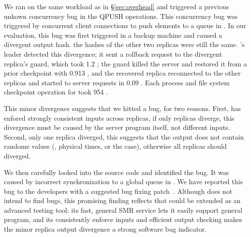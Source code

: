 We ran \ssdb on the same workload as in \S\ref{sec:overhead} and triggered a 
previous unkown concurrency bug in the QPUSH operations. This concurrency bug 
was triggered by concurrent client connections to push elements to a queue in 
\ssdb. In our evaluation, this bug was first triggered in a backup machine and 
caused a divergent output hash. the hashes of the other two replicas were 
still the same. \xxx's leader detected this divergence; it sent a 
rollback request to the divergent replica's guard, which took 1.2 \ms; 
the guard killed the \ssdb server and restored it from a prior 
checkpoint with 0.913 \ms, and the recovered replica reconnected to the other 
replicas and started to server requests in 0.09 \ms. Each process and file 
system checkpoint operation for \ssdb took 954 \ms.

This minor divergence suggests that we hitted a bug, for two 
reasons. First, \xxx has enfored strongly consistent inputs across replicas, if 
only replicas diverge, this divergence must be caused by the server program 
itself, not different inputs. Second, only one replica diverged, this suggests 
that the output does not contain randome values (\eg, physical times, or the 
\clamav case), otherwise all replicas should diverged.

We then carefully looked into the \ssdb source code and identified the bug. It 
was caused by incorrect synchronization to a global queue in \ssdb. We have 
reported this bug to the \ssdb developers with a suggested bug fixing 
patch~\cite{ssdb:bug}. Although \xxx does not intend to find bugs, this 
promising finding reflects that \xxx could be extended as an advanced testing 
tool: its fast, general SMR service lets it easily support general program, and 
its consistently enforce inputs and efficient output checking makes the minor 
replica output divergence a strong software bug indicator.

% 



 


